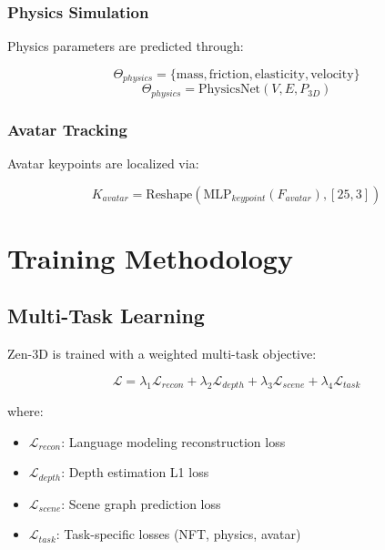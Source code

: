 \documentclass[11pt,a4paper]{article}
\begin{document}
\subsubsection{Physics Simulation}
Physics parameters are predicted through:

\begin{equation}
    \Theta_{physics} = \{\text{mass}, \text{friction}, \text{elasticity}, \text{velocity}\}
\end{equation}
\begin{equation}
    \Theta_{physics} = \text{PhysicsNet}(V, E, P_{3D})
\end{equation}

\subsubsection{Avatar Tracking}
Avatar keypoints are localized via:

\begin{equation}
    K_{avatar} = \text{Reshape}(\text{MLP}_{keypoint}(F_{avatar}), [25, 3])
\end{equation}

\section{Training Methodology}

\subsection{Multi-Task Learning}

Zen-3D is trained with a weighted multi-task objective:

\begin{equation}
    \mathcal{L} = \lambda_1 \mathcal{L}_{recon} + \lambda_2 \mathcal{L}_{depth} + \lambda_3 \mathcal{L}_{scene} + \lambda_4 \mathcal{L}_{task}
\end{equation}

where:
\begin{itemize}
    \item $\mathcal{L}_{recon}$: Language modeling reconstruction loss
    \item $\mathcal{L}_{depth}$: Depth estimation L1 loss
    \item $\mathcal{L}_{scene}$: Scene graph prediction loss
    \item $\mathcal{L}_{task}$: Task-specific losses (NFT, physics, avatar)
\end{itemize}
\end{document}
